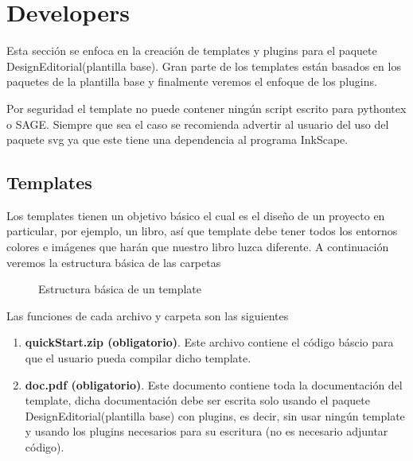 {	\section{Developers}
	Esta sección se enfoca en la creación de templates y plugins para el paquete DesignEditorial\printversion\space (plantilla base). Gran parte de los templates están basados en los paquetes de la plantilla base y finalmente veremos el enfoque de los plugins.
	\begin{boxbasic}[Nota]
		Por seguridad el template no puede contener ningún script escrito para pythontex o SAGE. Siempre que sea el caso se recomienda advertir al usuario del uso del paquete svg ya que este tiene una dependencia al programa InkScape. 
	\end{boxbasic}
	\subsection{Templates}
	Los templates tienen un objetivo básico el cual es el diseño de un proyecto en particular, por ejemplo, un libro, así que template debe tener todos los entornos colores e imágenes que harán que nuestro libro luzca diferente. A continuación veremos la estructura básica de las carpetas
	\begin{figure}[H]
		\caption{Estructura básica de un template}
		\label{fig:EstructuraTemplate}
	\end{figure} 
	Las funciones de cada archivo y carpeta son las siguientes
	\begin{enumerate}
		\item \textbf{quickStart.zip (obligatorio)}. Este archivo contiene el código báscio para que el usuario pueda compilar dicho template.
		\item \textbf{doc.pdf (obligatorio)}. Este documento contiene toda la documentación del template, dicha documentación debe ser escrita solo usando el paquete DesignEditorial\printversion\space (plantilla base) con plugins, es decir, sin usar ningún template y usando los plugins necesarios para su escritura (no es necesario adjuntar código).

\end{enumerate}}
